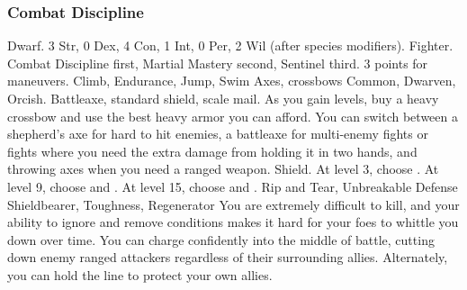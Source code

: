         \subsubsection{Combat Discipline}
             Dwarf.
             3 Str, 0 Dex, 4 Con, 1 Int, 0 Per, 2 Wil (after species modifiers).
             Fighter.
             Combat Discipline first, Martial Mastery second, Sentinel third.
             3 points for maneuvers.
             Climb, Endurance, Jump, Swim
             Axes, crossbows
             Common, Dwarven, Orcish.
             Battleaxe, standard shield, scale mail. As you gain levels, buy a heavy crossbow and use the best heavy armor you can afford.
            You can switch between a shepherd's axe for hard to hit enemies, a battleaxe for multi-enemy fights or fights where you need the extra damage from holding it in two hands, and throwing axes when you need a ranged weapon.
             Shield.
                At level 3, choose .
                At level 9, choose  and .
                At level 15, choose  and .
             Rip and Tear, Unbreakable Defense
             Shieldbearer, Toughness, Regenerator
             You are extremely difficult to kill, and your ability to ignore and remove conditions makes it hard for your foes to whittle you down over time.
            You can charge confidently into the middle of battle, cutting down enemy ranged attackers regardless of their surrounding allies.
            Alternately, you can hold the line to protect your own allies.

